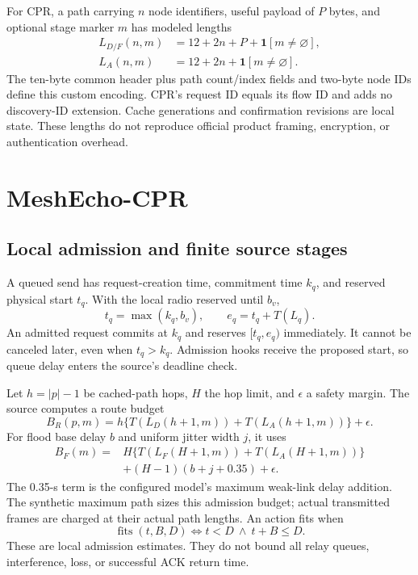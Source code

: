 For CPR, a path carrying $n$ node identifiers, useful payload of $P$ bytes,
and optional stage marker $m$ has modeled lengths
\begin{equation}
\begin{aligned}
L_{D/F}(n,m)&=12+2n+P+\mathbf{1}[m\ne\varnothing],\\
L_A(n,m)&=12+2n+\mathbf{1}[m\ne\varnothing].
\end{aligned}
\label{eq:wire}
\end{equation}
The ten-byte common header plus path count/index fields and two-byte node
IDs define this custom encoding. CPR's request ID equals its flow ID and
adds no discovery-ID extension. Cache generations and confirmation revisions
are local state. These lengths do not reproduce official product framing,
encryption, or authentication overhead.

\section{MeshEcho-CPR}
\label{sec:cpr}



\subsection{Local admission and finite source stages}

A queued send has request-creation time, commitment time $k_q$, and reserved
physical start $t_q$. With the local radio reserved until $b_v$,
\begin{equation}
t_q=\max(k_q,b_v),\qquad e_q=t_q+T(L_q).
\label{eq:commit}
\end{equation}
An admitted request commits at $k_q$ and reserves $[t_q,e_q)$ immediately.
It cannot be canceled later, even when $t_q>k_q$. Admission hooks receive
the proposed start, so queue delay enters the source's deadline check.

Let $h=|p|-1$ be cached-path hops, $H$ the hop limit, and $\epsilon$ a
safety margin. The source computes a route budget
\begin{equation}
B_R(p,m)=h\{T(L_D(h+1,m))+T(L_A(h+1,m))\}+\epsilon.
\label{eq:route-budget}
\end{equation}
For flood base delay $b$ and uniform jitter width $j$, it uses
\begin{equation}
\begin{aligned}
B_F(m)={}&H\{T(L_F(H+1,m))+T(L_A(H+1,m))\}\\
&+(H-1)(b+j+0.35)+\epsilon.
\end{aligned}
\label{eq:flood-budget}
\end{equation}
The 0.35-s term is the configured model's maximum weak-link delay addition.
The synthetic maximum path sizes this admission budget; actual transmitted
frames are charged at their actual path lengths. An action fits when
\begin{equation}
\operatorname{fits}(t,B,D)\iff t<D\ \land\ t+B\le D.
\label{eq:fits}
\end{equation}
These are local admission estimates. They do not bound all relay queues,
interference, loss, or successful ACK return time.


